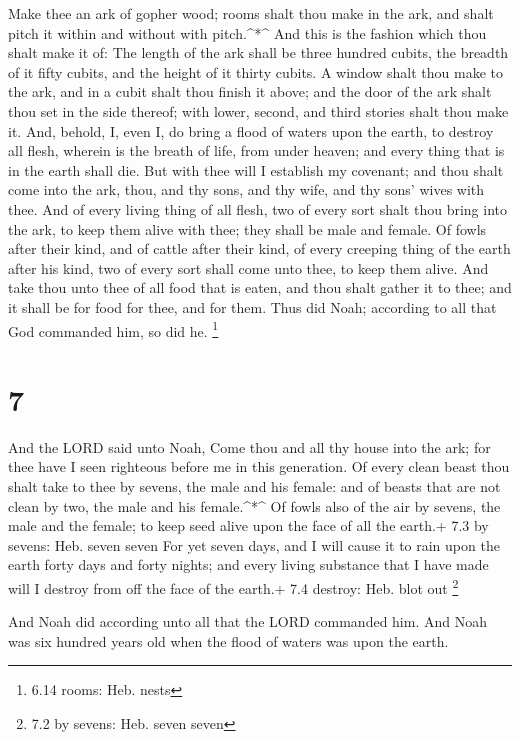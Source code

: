  Make thee an ark of gopher wood; rooms shalt thou make in
the ark, and shalt pitch it within and without with pitch.\^{}*\^{}
 And this is the fashion which thou shalt make it of: The
length of the ark shall be three hundred cubits, the breadth of it fifty
cubits, and the height of it thirty cubits.  A window shalt
thou make to the ark, and in a cubit shalt thou finish it above; and the
door of the ark shalt thou set in the side thereof; with lower, second,
and third stories shalt thou make it.  And, behold, I, even
I, do bring a flood of waters upon the earth, to destroy all flesh,
wherein is the breath of life, from under heaven; and every thing that
is in the earth shall die.  But with thee will I establish
my covenant; and thou shalt come into the ark, thou, and thy sons, and
thy wife, and thy sons' wives with thee.  And of every
living thing of all flesh, two of every sort shalt thou bring into the
ark, to keep them alive with thee; they shall be male and female.
 Of fowls after their kind, and of cattle after their kind,
of every creeping thing of the earth after his kind, two of every sort
shall come unto thee, to keep them alive.  And take thou
unto thee of all food that is eaten, and thou shalt gather it to thee;
and it shall be for food for thee, and for them.  Thus did
Noah; according to all that God commanded him, so did he. \footnote{6.14
  rooms: Heb. nests}

\hypertarget{section-6}{%
\section{7}\label{section-6}}

 And the LORD said unto Noah, Come thou and all thy house
into the ark; for thee have I seen righteous before me in this
generation.  Of every clean beast thou shalt take to thee by
sevens, the male and his female: and of beasts that are not clean by
two, the male and his female.\^{}*\^{}  Of fowls also of the
air by sevens, the male and the female; to keep seed alive upon the face
of all the earth.+ 7.3 by sevens: Heb. seven seven  For yet
seven days, and I will cause it to rain upon the earth forty days and
forty nights; and every living substance that I have made will I destroy
from off the face of the earth.+ 7.4 destroy: Heb. blot out \footnote{7.2
  by sevens: Heb. seven seven}

 And Noah did according unto all that the LORD commanded
him.  And Noah was six hundred years old when the flood of
waters was upon the earth.


